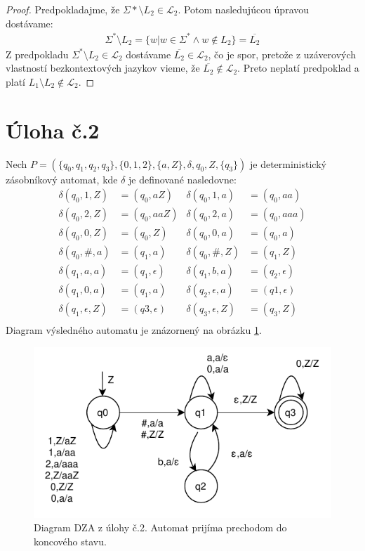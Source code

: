 \documentclass[10pt]{article}
\begin{document}
\begin{enumerate}
\begin{proof}
        Predpokladajme, že $\Sigma* \setminus L_2 \in \mathcal{L}_2$. Potom nasledujúcou úpravou
        dostávame:
        \begin{align*}
            \Sigma^* \setminus L_2 = \{w | w \in \Sigma^* \land w \notin L_2 \} = \overline{L_2} 
        \end{align*}
        Z predpokladu $ \Sigma^* \setminus L_2 \in \mathcal{L}_2$ dostávame $\overline{L_2} \in
        \mathcal{L}_2$, čo je spor, pretože z uzáverových vlastností bezkontextových jazykov vieme,
        že $\overline{L_2} \notin \mathcal{L}_2$. Preto neplatí predpoklad a platí $L_1 \setminus L_2 \notin
        \mathcal{L}_2$.
    \end{proof}
\end{enumerate}
\section*{Úloha č.2}
    Nech $P = (\{q_0, q_1, q_2, q_3\}, \{0,1,2\}, \{a,Z\}, \delta, q_0, Z, \{q_3\})$ je deterministický zásobníkový automat, kde
    $\delta$ je definované nasledovne:
    \begin{align*}
        \delta (q_0, 1, Z) &= (q_0, aZ)  & \delta (q_0, 1, a) &= (q_0, aa)\\
        \delta (q_0, 2, Z) &= (q_0, aaZ) & \delta (q_0, 2, a) &= (q_0, aaa)\\
        \delta (q_0, 0, Z) &= (q_0, Z)   & \delta (q_0, 0, a) &= (q_0, a)\\
        \delta (q_0, \#, a) &= (q_1, a)   & \delta (q_0, \#, Z) &= (q_1, Z)\\
        \delta (q_1, a, a) &= (q_1, \epsilon) & \delta (q_1, b, a) &= (q_2, \epsilon)\\
        \delta (q_1, 0, a) &= (q_1, a)   & \delta (q_2, \epsilon, a) &= (q1, \epsilon)\\
        \delta (q_1, \epsilon, Z) &= (q3, \epsilon) & \delta (q_3, \epsilon, Z) &= (q_3, Z)\\
    \end{align*}
    Diagram výsledného automatu je znázornený na obrázku \ref{automata}.

\begin{figure}
    \label{automata}
    \centering
    \includegraphics{dpda.pdf}
    \caption{Diagram DZA z úlohy č.2. Automat prijíma prechodom do koncového stavu.}
\end{figure}
\end{document}
